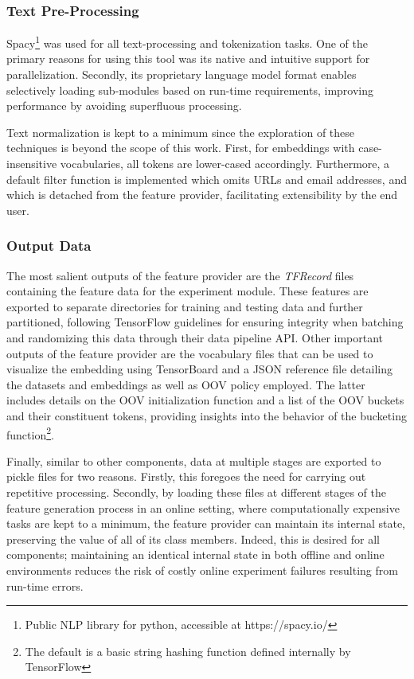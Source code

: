 \documentclass[12pt, a4paper]{report}
\theoremstyle{definition}
\theoremstyle{definition}%
\theoremstyle{definition}%
\theoremstyle{definition}%
\theoremstyle{definition}%
\theoremstyle{definition}%
\begin{document}
\subsubsection{Text Pre-Processing}
Spacy\footnote{Public NLP library for python, accessible at https://spacy.io/} was used for all text-processing and tokenization tasks. One of the primary reasons for using this tool was its native and intuitive support for parallelization. Secondly, its proprietary language model format enables selectively loading sub-modules based on run-time requirements, improving performance by avoiding superfluous processing.

Text normalization is kept to a minimum since the exploration of these techniques is beyond the scope of this work. First, for embeddings with case-insensitive vocabularies, all tokens are lower-cased accordingly. Furthermore, a default filter function is implemented which omits URLs and email addresses, and which is detached from the feature provider, facilitating extensibility by the end user.

\subsubsection{Output Data}
The most salient outputs of the feature provider are the \textit{TFRecord} files containing the feature data for the experiment module. These features are exported to separate directories for training and testing data and further partitioned, following TensorFlow guidelines for ensuring integrity when batching and randomizing this data through their data pipeline API. Other important outputs of the feature provider are the vocabulary files that can be used to visualize the embedding using TensorBoard and a JSON reference file detailing the datasets and embeddings as well as OOV policy employed. The latter includes details on the OOV initialization function and a list of the OOV buckets and their constituent tokens, providing insights into the behavior of the bucketing function\footnote{The default is a basic string hashing function defined internally by TensorFlow}.

Finally, similar to other components, data at multiple stages are exported to pickle files for two reasons. Firstly, this foregoes the need for carrying out repetitive processing. Secondly, by loading these files at different stages of the feature generation process in an online setting, where computationally expensive tasks are kept to a minimum, the feature provider can maintain its internal state, preserving the value of all of its class members. Indeed, this is desired for all components; maintaining an identical internal state in both offline and online environments reduces the risk of costly online experiment failures resulting from run-time errors.
\end{document}
